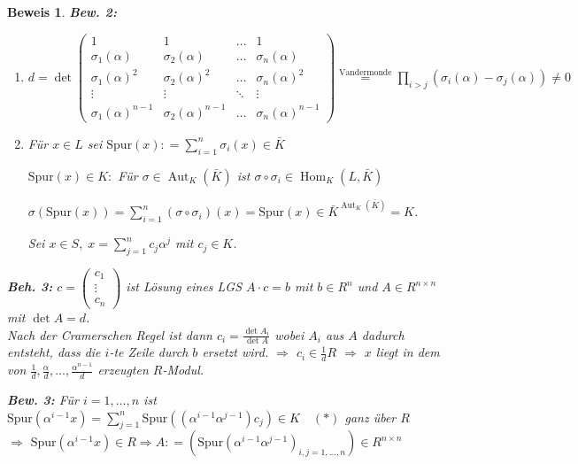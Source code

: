 \documentclass[a4paper,12pt]{scrbook}
\theoremstyle{break}
\theoremstyle{nonumberbreak}
\newtheorem{Bew}{Beweis}
\theoremstyle{nonumberplain}
\newcommand{\defeqr}[0]{\mathrel{\mathop:}=}
\DeclareMathOperator{\Aut}{Aut}
\DeclareMathOperator{\Hom}{Hom}
\begin{document}
\begin{Bew}
\textbf{Bew. 2:}
\begin{enumerate}
\item $d = \det
  \begin{pmatrix}
    1 & 1 & \dots & 1 \\
    \sigma_1(\alpha) & \sigma_2(\alpha) & \dots & \sigma_n(\alpha) \\
    \sigma_1(\alpha)^2 & \sigma_2(\alpha)^2 & \dots & \sigma_n(\alpha)^2 \\
    \vdots & \vdots & \ddots & \vdots \\
    \sigma_1(\alpha)^{n-1} & \sigma_2(\alpha)^{n-1} & \dots & \sigma_n(\alpha)^{n-1}
  \end{pmatrix}
  \overset{\text{Vandermonde}}{=} \displaystyle\prod_{i > j}
  (\sigma_i(\alpha) - \sigma_j(\alpha)) \not= 0$

\item Für $x \in L$ sei $\text{Spur}(x) \defeqr \sum_{i=1}^n \sigma_i(x) \in \bar{K}$

  $\text{Spur}(x) \in K:$ Für $\sigma \in \Aut_K(\bar{K})$ ist $\sigma \circ \sigma_i \in \Hom_K(L,\bar{K})$

  $\sigma(\text{Spur}(x)) = \sum_{i=1}^n (\sigma \circ \sigma_i)(x) = \text{Spur}(x) \in \bar{K}^{\Aut_K(\bar{K})} = K$.

  Sei $x \in S, \; x = \sum_{j=1}^n c_j \alpha^j$ mit $c_j \in K$.
\end{enumerate}

\textbf{Beh. 3:} $c = \begin{pmatrix} c_1\\ \vdots\\ c_n \end{pmatrix}$ ist
Lösung eines LGS $A \cdot c = b$ mit $b \in R^n$ und $A \in R^{n \times n}$
mit $\det A = d$.\\
Nach der Cramerschen Regel ist dann $c_i = \frac{\det A_i}{\det A}$ wobei
$A_i$ aus $A$ dadurch entsteht, dass die $i$-te Zeile durch $b$ ersetzt wird.
$\Rightarrow$ $c_i \in \frac{1}{d}R$ $\Rightarrow$ $x$ liegt in 
dem von $\frac{1}{d}, \frac{\alpha}{d}, \dots, \frac{\alpha^{n-1}}{d}$ erzeugten $R$-Modul.

\textbf{Bew. 3:} Für $i=1, \dots, n$ ist $\text{Spur}(\alpha^{i-1} x) = \sum_{j=1}^n \text{Spur}((\alpha^{i-1}\alpha^{j-1})c_j) \in K \quad (*)$ ganz über $R$\\
$\Rightarrow$ $\text{Spur}(\alpha^{i-1}x) \in R \Rightarrow A \defeqr (\text{Spur}(\alpha^{i-1} \alpha^{j-1})_{i,j = 1, \dots, n}) \in R^{n \times n}$


\end{Bew}
\end{document}
